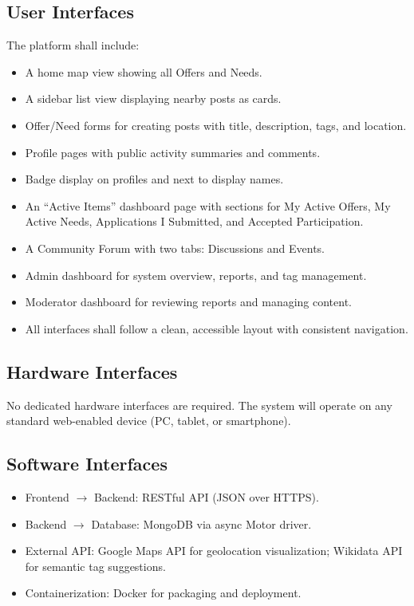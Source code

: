 \documentclass[11pt,a4paper]{report}
\begin{document}
\subsection{User Interfaces}

The platform shall include:
\begin{itemize}
    \item A home map view showing all Offers and Needs.
    \item A sidebar list view displaying nearby posts as cards.
    \item Offer/Need forms for creating posts with title, description, tags, and location.
    \item Profile pages with public activity summaries and comments.
    \item Badge display on profiles and next to display names.
    \item An ``Active Items'' dashboard page with sections for My Active Offers, My Active Needs, Applications I Submitted, and Accepted Participation.
    \item A Community Forum with two tabs: Discussions and Events.
    \item Admin dashboard for system overview, reports, and tag management.
    \item Moderator dashboard for reviewing reports and managing content.
    \item All interfaces shall follow a clean, accessible layout with consistent navigation.
\end{itemize}

\subsection{Hardware Interfaces}

No dedicated hardware interfaces are required. The system will operate on any standard web-enabled device (PC, tablet, or smartphone).

\subsection{Software Interfaces}

\begin{itemize}
    \item Frontend $\rightarrow$ Backend: RESTful API (JSON over HTTPS).
    \item Backend $\rightarrow$ Database: MongoDB via async Motor driver.
    \item External API: Google Maps API for geolocation visualization; Wikidata API for semantic tag suggestions.
    \item Containerization: Docker for packaging and deployment.
\end{itemize}
\end{document}
